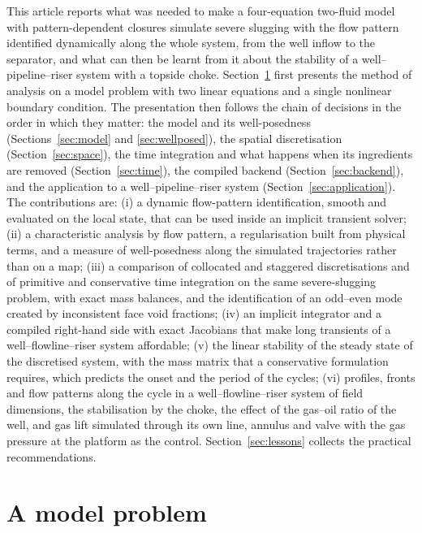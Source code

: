 \documentclass[a4paper,fleqn]{cas-sc}
\begin{document}
This article reports what was needed to make a four-equation two-fluid model with pattern-dependent closures \citep{souza2010} simulate severe slugging with the flow pattern identified dynamically along the whole system, from the well inflow to the separator, and what can then be learnt from it about the stability of a well--pipeline--riser system with a topside choke. Section~\ref{sec:toy} first presents the method of analysis on a model problem with two linear equations and a single nonlinear boundary condition. The presentation then follows the chain of decisions in the order in which they matter: the model and its well-posedness (Sections~\ref{sec:model} and \ref{sec:wellposed}), the spatial discretisation (Section~\ref{sec:space}), the time integration and what happens when its ingredients are removed (Section~\ref{sec:time}), the compiled backend (Section~\ref{sec:backend}), and the application to a well--pipeline--riser system (Section~\ref{sec:application}). The contributions are:
(i) a dynamic flow-pattern identification, smooth and evaluated on the local state, that can be used inside an implicit transient solver;
(ii) a characteristic analysis by flow pattern, a regularisation built from physical terms, and a measure of well-posedness along the simulated trajectories rather than on a map;
(iii) a comparison of collocated and staggered discretisations and of primitive and conservative time integration on the same severe-slugging problem, with exact mass balances, and the identification of an odd--even mode created by inconsistent face void fractions;
(iv) an implicit integrator and a compiled right-hand side with exact Jacobians that make long transients of a well--flowline--riser system affordable;
(v) the linear stability of the steady state of the discretised system, with the mass matrix that a conservative formulation requires, which predicts the onset and the period of the cycles;
(vi) profiles, fronts and flow patterns along the cycle in a well--flowline--riser system of field dimensions, the stabilisation by the choke, the effect of the gas--oil ratio of the well, and gas lift simulated through its own line, annulus and valve with the gas pressure at the platform as the control.
Section~\ref{sec:lessons} collects the practical recommendations.

\section{A model problem}\label{sec:toy}
\end{document}
